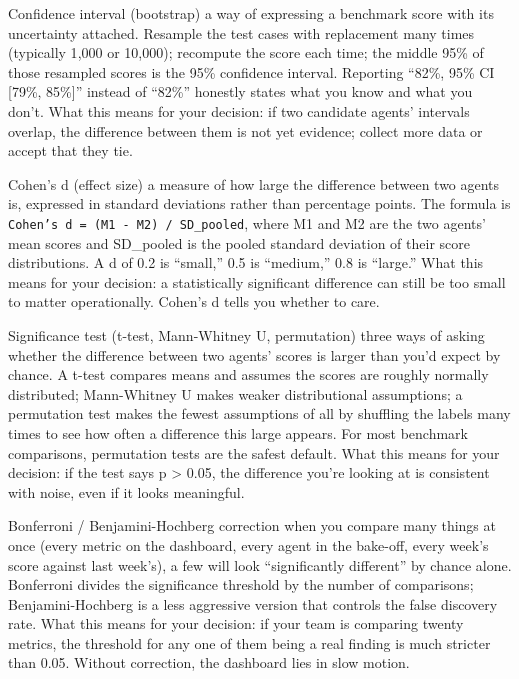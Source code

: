 \begin{TNdefinition}{Confidence interval (bootstrap)} a way of expressing a benchmark score with its uncertainty attached. Resample the test cases with replacement many times (typically 1{,}000 or 10{,}000); recompute the score each time; the middle 95\% of those resampled scores is the 95\% confidence interval. Reporting ``82\%, 95\% CI [79\%, 85\%]'' instead of ``82\%'' honestly states what you know and what you don't. What this means for your decision: if two candidate agents' intervals overlap, the difference between them is not yet evidence; collect more data or accept that they tie. \end{TNdefinition}

\begin{TNdefinition}{Cohen's d (effect size)} a measure of how large the difference between two agents is, expressed in standard deviations rather than percentage points. The formula is \texttt{Cohen's d = (M1 - M2) / SD\_pooled}, where M1 and M2 are the two agents' mean scores and SD\_pooled is the pooled standard deviation of their score distributions. A d of 0.2 is ``small,'' 0.5 is ``medium,'' 0.8 is ``large.'' What this means for your decision: a statistically significant difference can still be too small to matter operationally. Cohen's d tells you whether to care. \end{TNdefinition}

\begin{TNdefinition}{Significance test (t-test, Mann-Whitney U, permutation)} three ways of asking whether the difference between two agents' scores is larger than you'd expect by chance. A t-test compares means and assumes the scores are roughly normally distributed; Mann-Whitney U makes weaker distributional assumptions; a permutation test makes the fewest assumptions of all by shuffling the labels many times to see how often a difference this large appears. For most benchmark comparisons, permutation tests are the safest default. What this means for your decision: if the test says p > 0.05, the difference you're looking at is consistent with noise, even if it looks meaningful. \end{TNdefinition}

\begin{TNdefinition}{Bonferroni / Benjamini-Hochberg correction} when you compare many things at once (every metric on the dashboard, every agent in the bake-off, every week's score against last week's), a few will look ``significantly different'' by chance alone. Bonferroni divides the significance threshold by the number of comparisons; Benjamini-Hochberg is a less aggressive version that controls the false discovery rate. What this means for your decision: if your team is comparing twenty metrics, the threshold for any one of them being a real finding is much stricter than 0.05. Without correction, the dashboard lies in slow motion. \end{TNdefinition}

